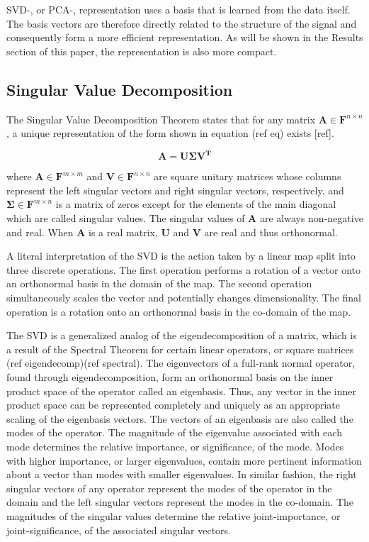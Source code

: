 \documentclass[conference]{IEEEtran}
\begin{document}
    SVD-, or PCA-, representation uses a basis that is learned from the data itself. The basis vectors are therefore directly related to the structure of the signal and consequently form a more efficient representation. As will be shown in the Results section of this paper, the representation is also more compact.
    
    \subsection{Singular Value Decomposition}
    The Singular Value Decomposition Theorem states that for any matrix $\mathbf{A} \in \mathbf{F}^{n \times n}$, a unique representation of the form shown in equation (ref eq) exists [ref].

     \begin{equation}
     \mathbf{A} = \mathbf{U\Sigma }{\mathbf{V}^\mathbf{T}}
     \end{equation}

    where $\mathbf{A} \in \mathbf{F}^{m \times m}$ and $\mathbf{V} \in \mathbf{F}^{n \times n}$ are square unitary
    matrices whose columns represent the left singular vectors and right singular vectors, respectively, and $\mathbf{\Sigma} \in \mathbf{F}^{m \times n}$ is a matrix of zeros except for the elements of the main diagonal which are called singular values. The singular values of $\mathbf{A}$ are always non-negative and real. When $\mathbf{A}$ is a real matrix, $\mathbf{U}$ and $\mathbf{V}$ are real and thus orthonormal.

    A literal interpretation of the SVD is the action taken by a linear map split into three discrete operations. The first operation performs a rotation of a vector onto an orthonormal basis in the domain of the map. The second operation simultaneously scales the vector and potentially changes dimensionality. The final operation is a rotation onto an orthonormal basis in the co-domain of the map.

    The SVD is a generalized analog of the eigendecomposition of a matrix, which is a result of the Spectral Theorem for certain linear operators, or square matrices (ref eigendecomp)(ref spectral). The eigenvectors of a full-rank normal operator, found through eigendecomposition, form an orthonormal basis on the inner product space of the operator called an eigenbasis. Thus, any vector in the inner product space can be represented completely and uniquely as an appropriate scaling of the eigenbasis vectors. The vectors of an eigenbasis are also called the modes of the operator. The magnitude of the eigenvalue associated with each mode determines the relative importance, or significance, of the mode. Modes with higher importance, or larger eigenvalues, contain more pertinent information about a vector than modes with smaller eigenvalues. In similar fashion, the right singular vectors of any operator represent the modes of the operator in the domain and the left singular vectors represent the modes in the co-domain. The magnitudes of the singular values determine the relative joint-importance, or joint-significance, of the associated singular vectors.
    
\end{document}
